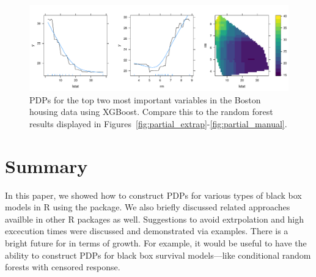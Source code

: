 \begin{figure}[htbp]
  \centering
  \includegraphics[width=1.0\linewidth]{boston_xgb}
  \caption{PDPs for the top two most important variables in the Boston housing data using XGBoost. Compare this to the random forest results displayed in Figures~\ref{fig:partial_extrap}-\ref{fig:partial_manual}.}
  \label{fig:boston_xgb}
\end{figure}

\section{Summary}

In this paper, we showed how to construct PDPs for various types of black box models in R using the  package. We also briefly discussed related approaches availble in other R packages as well. Suggestions to avoid extrpolation and high excecution times were discussed and demonstrated via examples. There is a bright future for  in terms of growth. For example, it would be useful to have the ability to construct PDPs for black box survival models---like conditional random forests with censored response. %


